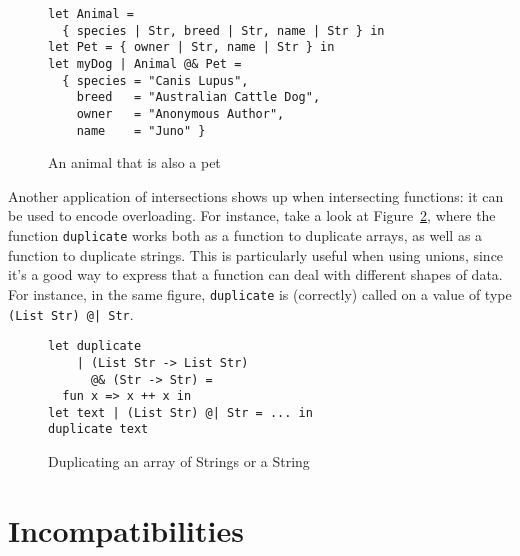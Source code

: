 \documentclass[sigplan,10pt,review,anonymous]{acmart}
\newcommand{\unsure}[2][1=]{}
\newcommand{\nickel}[1]{\lstinline[language=nickel]{#1}}
\begin{document}
\begin{figure}[h]
\begin{lstlisting}[language=nickel]
let Animal =
  { species | Str, breed | Str, name | Str } in
let Pet = { owner | Str, name | Str } in
let myDog | Animal @& Pet =
  { species = "Canis Lupus",
    breed   = "Australian Cattle Dog",
    owner   = "Anonymous Author",
    name    = "Juno" }
\end{lstlisting}
\caption{An animal that is also a pet}
\label{fig:intersection-record}
\end{figure}

\unsure{Maybe it's better to give it in Typescript syntax?
left it commented just in case}



Another application of intersections shows up when intersecting
functions: it can be used to encode overloading.
For instance, take a look at Figure~\ref{fig:intersection-overloading-ex}, where the function
\nickel{duplicate} works both as a function to duplicate
arrays, as well as a function to duplicate strings.
This is particularly useful when using unions, since it's a
good way to express that a function can deal with different
shapes of data.
For instance, in the same figure, \nickel{duplicate} is (correctly) called
on a value of type \nickel{(List Str) @| Str}.

\begin{figure}[h]
\begin{lstlisting}[language=nickel]
let duplicate
    | (List Str -> List Str)
      @& (Str -> Str) =
  fun x => x ++ x in
let text | (List Str) @| Str = ... in
duplicate text
\end{lstlisting}
\caption{Duplicating an array of Strings or a String}
\label{fig:intersection-overloading-ex}
\end{figure}

\section{Incompatibilities}
\label{sec:issues-sem}
\end{document}
